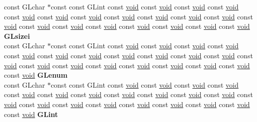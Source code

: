 \begin{DoxyCompactItemize}
\begin{tabbing}
\>const GLchar $\ast$const const GLint const \hyperlink{interfacevoid}{void} const \hyperlink{interfacevoid}{void} const \hyperlink{interfacevoid}{void} const \hyperlink{interfacevoid}{void} const \hyperlink{interfacevoid}{void} const \hyperlink{interfacevoid}{void} const \hyperlink{interfacevoid}{void} const \hyperlink{interfacevoid}{void} const \hyperlink{interfacevoid}{void} const \hyperlink{interfacevoid}{void} const \hyperlink{interfacevoid}{void} const \hyperlink{interfacevoid}{void} const \hyperlink{interfacevoid}{void} const \hyperlink{interfacevoid}{void} const \hyperlink{interfacevoid}{void} const \hyperlink{interfacevoid}{void} const \hyperlink{interfacevoid}{void} const \hyperlink{interfacevoid}{void} const \hyperlink{interfacevoid}{void} {\bfseries GLsizei}\\
\>const GLchar $\ast$const const GLint const \hyperlink{interfacevoid}{void} const \hyperlink{interfacevoid}{void} const \hyperlink{interfacevoid}{void} const \hyperlink{interfacevoid}{void} const \hyperlink{interfacevoid}{void} const \hyperlink{interfacevoid}{void} const \hyperlink{interfacevoid}{void} const \hyperlink{interfacevoid}{void} const \hyperlink{interfacevoid}{void} const \hyperlink{interfacevoid}{void} const \hyperlink{interfacevoid}{void} const \hyperlink{interfacevoid}{void} const \hyperlink{interfacevoid}{void} const \hyperlink{interfacevoid}{void} const \hyperlink{interfacevoid}{void} const \hyperlink{interfacevoid}{void} const \hyperlink{interfacevoid}{void} const \hyperlink{interfacevoid}{void} const \hyperlink{interfacevoid}{void} const \hyperlink{interfacevoid}{void} {\bfseries GLenum}\\
\>const GLchar $\ast$const const GLint const \hyperlink{interfacevoid}{void} const \hyperlink{interfacevoid}{void} const \hyperlink{interfacevoid}{void} const \hyperlink{interfacevoid}{void} const \hyperlink{interfacevoid}{void} const \hyperlink{interfacevoid}{void} const \hyperlink{interfacevoid}{void} const \hyperlink{interfacevoid}{void} const \hyperlink{interfacevoid}{void} const \hyperlink{interfacevoid}{void} const \hyperlink{interfacevoid}{void} const \hyperlink{interfacevoid}{void} const \hyperlink{interfacevoid}{void} const \hyperlink{interfacevoid}{void} const \hyperlink{interfacevoid}{void} const \hyperlink{interfacevoid}{void} const \hyperlink{interfacevoid}{void} const \hyperlink{interfacevoid}{void} const \hyperlink{interfacevoid}{void} const \hyperlink{interfacevoid}{void} {\bfseries GLint}\\

\end{tabbing}
\end{DoxyCompactItemize}
